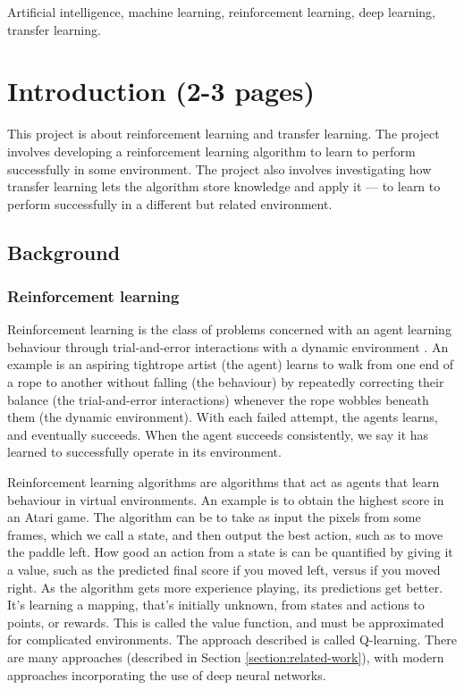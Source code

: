 \documentclass[12pt,a4paper]{article}
\begin{document}
\begin{keywords}
Artificial intelligence, machine learning, reinforcement learning, deep learning, transfer learning.
\end{keywords}

\section{Introduction (2-3 pages)}
This project is about reinforcement learning and transfer learning. The project involves developing a reinforcement learning algorithm to learn to perform successfully in some environment. The project also involves investigating how transfer learning lets the algorithm store knowledge and apply it --- to learn to perform successfully in a different but related environment.

\subsection{Background} 
\subsubsection{Reinforcement learning}
Reinforcement learning is the class of problems concerned with an agent learning behaviour through trial-and-error interactions with a dynamic environment \cite{Kaelbling1996}. An example is an aspiring tightrope artist (the agent) learns to walk from one end of a rope to another without falling (the behaviour) by repeatedly correcting their balance (the trial-and-error interactions) whenever the rope wobbles beneath them (the dynamic environment). With each failed attempt, the agents learns, and eventually succeeds. When the agent succeeds consistently, we say it has learned to successfully operate in its environment.  

Reinforcement learning algorithms are algorithms that act as agents that learn behaviour in virtual environments. An example is to obtain the highest score in an Atari game. The algorithm can be to take as input the pixels from some frames, which we call a state, and then output the best action, such as to move the paddle left. How good an action from a state is can be quantified by giving it a value, such as the predicted final score if you moved left, versus if you moved right. As the algorithm gets more experience playing, its predictions get better. It's learning a mapping, that's initially unknown, from states and actions to points, or rewards. This is called the value function, and must be approximated for complicated environments. The approach described is called Q-learning. There are many approaches (described in Section \ref{section:related-work}), with modern approaches incorporating the use of deep neural networks. 
\end{document}
